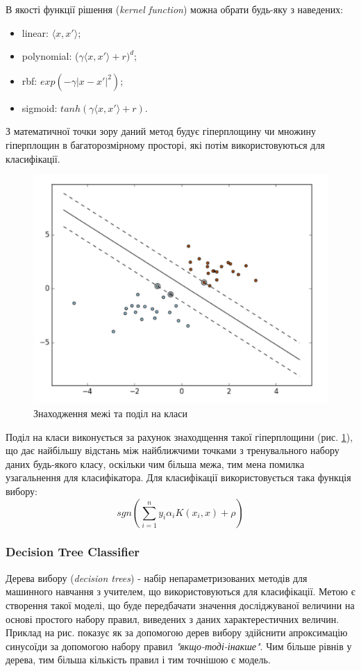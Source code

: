 В якості функції рішення (\textit{kernel function}) можна обрати будь-яку з наведених:
\begin{itemize}  
	\item linear: $\langle x, x'\rangle$;
	\item polynomial: ($\gamma\langle x, x'\rangle + r)^d$;
	\item rbf: $exp(-\gamma|x-x'|^2)$;
	\item sigmoid: $tanh(\gamma\langle x, x'\rangle + r)$.
\end{itemize}

З математичної точки зору даний метод будує гіперплощину чи множину гіперплощин в багаторозмірному просторі, які потім використовуються для класифікації. 

\begin{figure}[h!]
  \includegraphics[width=\linewidth]{figures/svm.png}
  \caption{Знаходження межі та поділ на класи}
  \label{fig:svm}
\end{figure}

Поділ на класи виконується за рахунок знаходщення такої гіперплощини (рис. \ref{fig:svm}), що дає найбільшу відстань між найближчими точками з тренувального набору даних будь-якого класу, оскільки чим більша межа, тим мена помилка узагальнення для класифікатора. Для класифікації використовується така функція вибору:
\begin{equation}
    \label{eq:svc}
    sgn(\sum_{i=1}^n y_{i}\alpha_{i}K(x_{i}, x)+\rho)
\end{equation}

\subsubsection{Decision Tree Classifier}
Дерева вибору (\textit{decision trees}) - набір непараметризованих методів для машинного навчання з учителем, що використовуються для класифікації. Метою є створення такої моделі, що буде передбачати значення досліджуваної величини на основі простого набору правил, виведених з даних характерестичних величин. Приклад на рис. показує як за допомогою дерев вибору здійснити апроксимацію синусоїди за допомогою набору правил \textit{"якщо-тоді-інакше"}. Чим більше рівнів у дерева, тим більша кількість правил і тим точнішою є модель.

